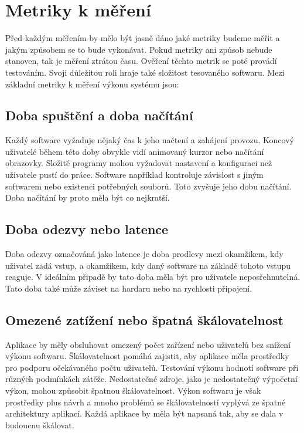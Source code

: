 \section*{Metriky k měření}

Před každým měřením by mělo být jasně dáno jaké metriky budeme měřit a jakým způsobem se to bude vykonávat. Pokud metriky ani způsob nebude stanoven, tak je měření ztrátou času.
Ověření těchto metrik se poté provádí testováním. Svoji důležitou roli hraje také složitost tesovaného softwaru. Mezi základní metriky k měření výkonu systému jsou:

\subsection*{Doba spuštění a doba načítání}

Každý software vyžaduje nějaký čas k jeho načtení a zahájení provozu. Koncový uživatelé během této doby obvykle vidí animovaný kurzor nebo načítání obrazovky.
Složité programy mohou vyžadovat nastavení a konfiguraci než uživatele pustí do práce. Software například kontroluje závislost s jiným softwarem nebo existenci potřebných souborů.
Toto zvyšuje jeho dobu načítání. Doba načítání by proto měla být co nejkratší.

\subsection*{Doba odezvy nebo latence}

Doba odezvy označováná jako latence je doba prodlevy mezi okamžikem, kdy uživatel zadá vstup, a okamžikem, kdy daný software na základě tohoto vstupu reaguje.
V ideálním připadě by tato doba měla být pro uživatele neposřehnutelná. Tato doba také může záviset na hardaru nebo na rychlosti připojení.

\subsection*{Omezené zatížení nebo špatná škálovatelnost}

Aplikace by měly obsluhovat omezený počet zařízení nebo uživatelů bez snížení výkonu softwaru. Škálovatelnost pomáhá zajistit, aby aplikace měla prostředky pro podporu očekávaného počtu uživatelů.
Testování výkonu hodnotí software při různých podmínkách zátěže. Nedostatečné zdroje, jako je nedostatečný výpočetní výkon, mohou způsobit špatnou škálovatelnost.
Výkon softwaru je však prostředky plus návrh a mnoho problémů se škálovatelností vyplývá ze špatné architektury aplikací. Každá aplikace by měla být napsaná tak, aby se dala v budoucnu škálovat.

